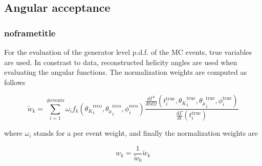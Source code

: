 \documentclass[aspectratio=169,9pt,handout]{beamer}
\begin{document}
\subsection*{Angular acceptance}
\begin{frame}[default] %
  \frametitle{noframetitle}
  
  For the evaluation of the generator level p.d.f. of the MC events, true variables are used.
  In constrast to data, reconstructed helicity angles are used when evaluating the angular
  functions. The normalization weights are computed as follows
  
  $$
  \tilde{w}_k =
  \sum_{i=1}^{\# \mathrm{events}} \omega_i
  f_k({\theta_K}_i^{\mathrm{reco}},{\theta_{\mu}}_i^{\mathrm{reco}},{\phi}_{i}^{\mathrm{reco}})
  \frac
  { \frac{d\Gamma^4}{dtd\Omega}  (t_i^{\mathrm{true}},{\theta_K}_i^{\mathrm{true}},{\theta_{\mu}}_i^{\mathrm{true}},{\phi}_{i}^{\mathrm{true}})}
  { \frac{d\Gamma}{dt}(t_i^{\mathrm{true}})}
  $$
  
  where $\omega_i$ stands for a per event weight, and finally the normalization weights are
  
  $$
  {w}_k = \frac{1}{\tilde{w}_0} \tilde{w}_k
  $$
  
  \end{frame} %
  
\end{document}
